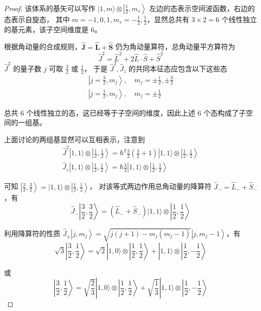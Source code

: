\begin{proof}
    该体系的基矢可以写作 $|1, m\rangle \otimes\left|\frac{1}{2}, m_{s}\right\rangle$ 左边的态表示空间波函数，右边的态表示自旋态，
    其中 $m=-1,0,1, m_{s}=-\frac{1}{2}, \frac{1}{2}$，显然总共有 $3 \times 2=6$ 个线性独立的基元素，该子空间维度是 $6$。

根据角动量的合成规则，$\hat{\mathbf{J}}=\hat{\mathbf{L}}+\hat{\mathbf{S}}$ 仍为角动量算符，总角动量平方算符为
$$\hat{J}^{2}=\hat{L}^{2}+2 \hat{L} \cdot \hat{S}+\hat{S}^{2}$$
$\hat{J}^{2}$ 的量子数 $j$ 可取 $\frac{3}{2}$ 或 $\frac{1}{2}$，
于是 $\hat{J}^{2}, \hat{J}_{z}$ 的共同本征态应包含以下这些态
$$
\begin{gathered}
\left|j=\frac{3}{2}, m_{j}\right\rangle, \quad m_{j}= \pm \frac{1}{2}, \pm \frac{3}{2} \\
\left|j=\frac{1}{2}, m_{j}\right\rangle, \quad m_{j}= \pm \frac{1}{2}
\end{gathered}
$$

总共 $6$ 个线性独立的态，这已经等于子空间的维度，因此上述 $6$ 个态构成了子空间的一组基。

上面讨论的两组基显然可以互相表示，注意到
$$
\begin{gathered}
\hat{J}^{2}|1,1\rangle \otimes\left|\frac{1}{2}, \frac{1}{2}\right\rangle=\hbar^{2} \frac{3}{2}\left(\frac{3}{2}+1\right)|1,1\rangle \otimes\left|\frac{1}{2}, \frac{1}{2}\right\rangle \\
\hat{J}_{z}|1,1\rangle \otimes\left|\frac{1}{2}, \frac{1}{2}\right\rangle=\hbar \frac{3}{2}|1,1\rangle \otimes\left|\frac{1}{2}, \frac{1}{2}\right\rangle
\end{gathered}
$$

可知 $\left|\frac{3}{2}, \frac{3}{2}\right\rangle=|1,1\rangle \otimes\left|\frac{1}{2}, \frac{1}{2}\right\rangle$，
对该等式两边作用总角动量的降算符 $\hat{J}_{-}=\hat{L}_{-}+\hat{S}_{-}$，有
$$\hat{J}_{-}\left|\frac{3}{2}, \frac{3}{2}\right\rangle
=\left(\hat{L}_{-}+\hat{S}_{-}\right)|1,1\rangle \otimes\left|\frac{1}{2}, \frac{1}{2}\right\rangle$$

利用降算符的性质 $\hat{J}_{ \pm}\left|j, m_{j}\right\rangle
=\sqrt{j(j+1)-m_{j}\left(m_{j}-1\right)}\left|j, m_{j}-1\right\rangle$，有
$$\sqrt{3}\left|\frac{3}{2}, \frac{1}{2}\right\rangle
=\sqrt{2}|1,0\rangle \otimes\left|\frac{1}{2}, \frac{1}{2}\right\rangle+|1,1\rangle \otimes\left|\frac{1}{2},-\frac{1}{2}\right\rangle$$

或
$$\left|\frac{3}{2}, \frac{1}{2}\right\rangle
=\sqrt{\frac{2}{3}}|1,0\rangle \otimes\left|\frac{1}{2}, 
\frac{1}{2}\right\rangle+\sqrt{\frac{1}{3}}|1,1\rangle \otimes\left|\frac{1}{2},-\frac{1}{2}\right\rangle$$


\end{proof}
